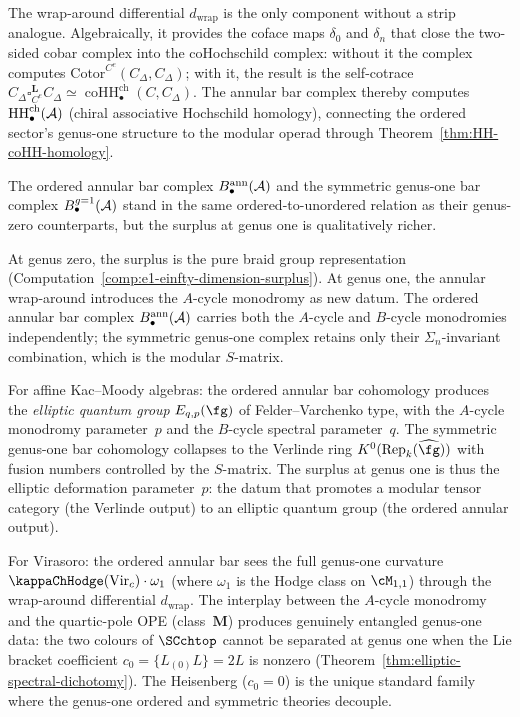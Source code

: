 The wrap-around differential $d_{\mathrm{wrap}}$ is the
only component without a strip analogue. Algebraically,
it provides the coface maps $\delta_0$ and $\delta_n$ that
close the two-sided cobar complex into the coHochschild
complex: without it the complex computes
$\mathrm{Cotor}^{C^e}(C_\Delta,C_\Delta)$; with it, the
result is the self-cotrace
$C_\Delta\square_{C^e}^{\mathbf{L}}
C_\Delta\simeq
\operatorname{coHH}_\bullet^{\mathrm{ch}}(C,C_\Delta)$.
The annular bar complex thereby computes
$\operatorname{HH}_\bullet^{\mathrm{ch}}(\mathcal{A})$ (chiral associative
Hochschild homology), connecting the ordered sector's
genus-one structure to the modular operad through
Theorem~\ref{thm:HH-coHH-homology}.

\begin{remark}%
\label{rem:genus-one-e1-einfty-surplus}%
%
The ordered annular bar complex
$B^{\mathrm{ann}}_\bullet(\mathcal{A})$ and the
symmetric genus-one bar complex
$B^{g=1}_\bullet(\mathcal{A})$ stand in the same
ordered-to-unordered relation as their genus-zero
counterparts, but the surplus at genus one is
qualitatively richer.

At genus zero, the surplus is the pure braid group
representation (Computation~\ref{comp:e1-einfty-dimension-surplus}).
At genus one, the annular wrap-around introduces
the $A$-cycle monodromy as new datum. The ordered
annular bar complex $B^{\mathrm{ann}}_\bullet(\mathcal{A})$
carries both the $A$-cycle and $B$-cycle monodromies
independently; the symmetric genus-one complex
retains only their $\Sigma_n$-invariant combination,
which is the modular $S$-matrix.

For affine Kac--Moody algebras: the ordered annular
bar cohomology produces the \emph{elliptic quantum group}
$E_{q,p}(\fg)$ of Felder--Varchenko type, with the
$A$-cycle monodromy parameter~$p$ and the $B$-cycle
spectral parameter~$q$. The symmetric genus-one bar
cohomology collapses to the Verlinde ring
$K^0(\mathrm{Rep}_k(\widehat{\fg}))$ with fusion
numbers controlled by the $S$-matrix. The surplus at
genus one is thus the elliptic deformation parameter~$p$:
the datum that promotes a modular tensor category
(the Verlinde output) to an elliptic quantum group
(the ordered annular output).

For Virasoro: the ordered annular bar sees the full
genus-one curvature $\kappaChHodge(\mathrm{Vir}_c)\cdot\omega_1$
(where $\omega_1$ is the Hodge class on $\cM_{1,1}$)
through the wrap-around differential $d_{\mathrm{wrap}}$.
The interplay between the $A$-cycle monodromy and the
quartic-pole OPE (class~$\mathbf{M}$) produces
genuinely entangled genus-one data: the two colours of
$\SCchtop$ cannot be separated at genus one when the
Lie bracket coefficient $c_0 = \{L_{(0)}L\} = 2L$ is
nonzero
(Theorem~\ref{thm:elliptic-spectral-dichotomy}).
The Heisenberg ($c_0 = 0$) is the unique standard
family where the genus-one ordered and symmetric
theories decouple.
\end{remark}

